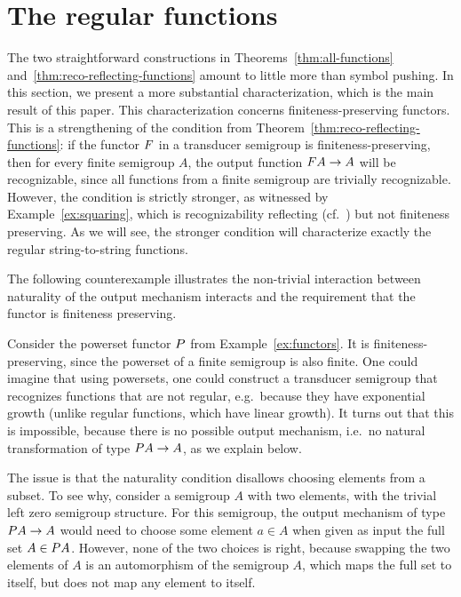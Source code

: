 \section{The regular functions}
\label{sec:reg-char}
The two straightforward constructions in Theorems~\ref{thm:all-functions} and~\ref{thm:reco-reflecting-functions}  amount to little more than symbol pushing. In this section, we present a more substantial characterization, which is the main result of this paper.
This characterization concerns finiteness-preserving functors.
This is a strengthening of the condition from Theorem~\ref{thm:reco-reflecting-functions}: if the functor $\functor$ in a transducer semigroup is finiteness-preserving, then for every finite semigroup $A$, the output function $\functor A \to A$ will be recognizable, since all functions from a finite semigroup are trivially recognizable.  However, the condition is strictly stronger, as witnessed by Example~\ref{ex:squaring}, which is recognizability reflecting (cf.~) but not finiteness preserving. As we will see, the stronger condition will characterize exactly the regular string-to-string functions.

The following counterexample illustrates the non-trivial interaction between naturality of the output mechanism interacts and the requirement that 
the functor is finiteness preserving.

\begin{example}
    Consider the powerset functor $\powerset$ from Example~\ref{ex:functors}. It is finiteness-preserving, since the powerset of a finite semigroup is also finite. One could imagine that using powersets, one could construct a transducer semigroup that recognizes functions that are not regular, e.g.~because they have exponential growth (unlike regular functions, which have linear growth). It turns out that this is impossible, because there is no possible output mechanism, i.e.~no natural transformation of type $\powerset A \to A$, as we explain below.

    The issue is that the naturality condition disallows choosing elements from a subset.  To see why, consider a semigroup $A$ with two elements, with the trivial left zero semigroup structure. For this semigroup, the output mechanism of type $\powerset A \to A$ would need to choose some element $a \in A$ when given as input the full set $A \in \powerset A$. However, none of the two choices is right, because swapping the two elements of $A$ is an automorphism of the semigroup $A$, which maps the full set to itself, but does not map any element to itself.
\end{example}

